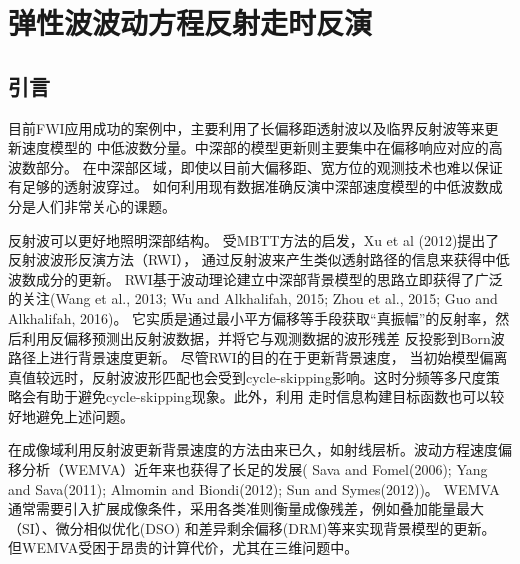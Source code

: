 \chapter{弹性波波动方程反射走时反演}

\section{引言}
目前FWI应用成功的案例中，主要利用了长偏移距透射波以及临界反射波等来更新速度模型的
中低波数分量。中深部的模型更新则主要集中在偏移响应对应的高波数部分。
在中深部区域，即使以目前大偏移距、宽方位的观测技术也难以保证有足够的透射波穿过。
如何利用现有数据准确反演中深部速度模型的中低波数成分是人们非常关心的课题。

反射波可以更好地照明深部结构。
受MBTT方法的启发，Xu et al
(2012)\cite{xu:2012}提出了反射波波形反演方法（RWI），
通过反射波来产生类似透射路径的信息来获得中低波数成分的更新。
RWI基于波动理论建立中深部背景模型的思路立即获得了广泛的关注(Wang et al., 2013\cite{Wang2013}; Wu and Alkhalifah, 2015; 
Zhou et al., 2015\cite{zhou:2015}; Guo and Alkhalifah, 2016\cite{Guo2016})。
它实质是通过最小平方偏移等手段获取“真振幅”的反射率，然后利用反偏移预测出反射波数据，并将它与观测数据的波形残差
反投影到Born波路径上进行背景速度更新。
尽管RWI的目的在于更新背景速度，
当初始模型偏离真值较远时，反射波波形匹配也会受到cycle-skipping影响。这时分频等多尺度策略会有助于避免cycle-skipping现象\cite{Wang2013}。此外，利用
走时信息构建目标函数也可以较好地避免上述问题。

在成像域利用反射波更新背景速度的方法由来已久，如射线层析\cite{Stork1992}。波动方程速度偏移分析（WEMVA）近年来也获得了长足的发展(
Sava and
Fomel(2006)\cite{SavaEtAl2006}; Yang and Sava(2011)\cite{YangEtAl2011}; Almomin and
Biondi(2012)\cite{Almomin2012}; Sun and Symes(2012)\cite{SunEtAl2012})。
WEMVA通常需要引入扩展成像条件，采用各类准则衡量成像残差，例如叠加能量最大（SI）\cite{ChaventEtAl1995}、微分相似优化(DSO)\cite{SymesEtAl1991}
和差异剩余偏移(DRM)\cite{SavaEtAl2004}等来实现背景模型的更新。
但WEMVA受困于昂贵的计算代价，尤其在三维问题中。

